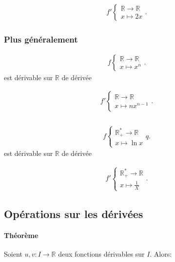 \documentclass{article}
\newcommand{\R}{\mathbb{R}}
\begin{document}
\begin{align*}
	f'\begin{cases}
		\R\to \R\\
		x\mapsto 2x
	\end{cases}
.\end{align*}

\subsubsection{Plus généralement}
\begin{align*}
	f \begin{cases}
		\R \to \R \\
		x\mapsto x^n
	\end{cases}
.\end{align*} est dérivable sur $\R$ de dérivée

\begin{align*}
	f'\begin{cases}
		\R \to \R \\
		x\mapsto nx^{n-1}
	\end{cases}
.\end{align*}

\subsubsection{}
\begin{align*}
	f \begin{cases}
		\R_+^\ast \to \R \\
		x\mapsto \ln x
	\end{cases}q
.\end{align*} est dérivable sur $\R$ de dérivée

\begin{align*}
	f'\begin{cases}
		\R_+^\ast \to \R \\
		x\mapsto \frac{1}{X}
	\end{cases}
.\end{align*}

\subsection{Opérations sur les dérivées}
\paragraph{Théorème}

Soient $u, v : I \to \R$ deux fonctions dérivables sur $I$. Alors:
\end{document}
